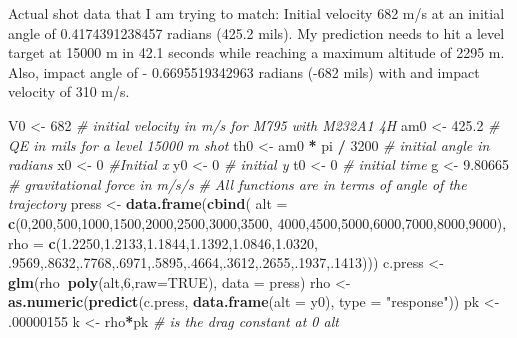 \documentclass[
]{article}
\newenvironment{Shaded}{\begin{snugshade}}{\end{snugshade}}
\newcommand{\CommentTok}[1]{\textcolor[rgb]{0.56,0.35,0.01}{\textit{#1}}}
\newcommand{\DataTypeTok}[1]{\textcolor[rgb]{0.13,0.29,0.53}{#1}}
\newcommand{\DecValTok}[1]{\textcolor[rgb]{0.00,0.00,0.81}{#1}}
\newcommand{\FloatTok}[1]{\textcolor[rgb]{0.00,0.00,0.81}{#1}}
\newcommand{\KeywordTok}[1]{\textcolor[rgb]{0.13,0.29,0.53}{\textbf{#1}}}
\newcommand{\NormalTok}[1]{#1}
\newcommand{\OperatorTok}[1]{\textcolor[rgb]{0.81,0.36,0.00}{\textbf{#1}}}
\newcommand{\OtherTok}[1]{\textcolor[rgb]{0.56,0.35,0.01}{#1}}
\newcommand{\StringTok}[1]{\textcolor[rgb]{0.31,0.60,0.02}{#1}}
\begin{document}
Actual shot data that I am trying to match: Initial velocity 682 m/s at
an initial angle of 0.4174391238457 radians (425.2 mils). My prediction
needs to hit a level target at 15000 m in 42.1 seconds while reaching a
maximum altitude of 2295 m. Also, impact angle of - 0.6695519342963
radians (-682 mils) with and impact velocity of 310 m/s.

\begin{Shaded}
\begin{Highlighting}[]
\NormalTok{V0 <-}\StringTok{ }\DecValTok{682} \CommentTok{# initial velocity in m/s for M795 with M232A1 4H}
\NormalTok{am0 <-}\StringTok{ }\FloatTok{425.2} \CommentTok{# QE in mils for a level 15000 m shot}
\NormalTok{th0 <-}\StringTok{ }\NormalTok{am0 }\OperatorTok{*}\StringTok{ }\NormalTok{pi }\OperatorTok{/}\StringTok{ }\DecValTok{3200} \CommentTok{# initial angle in radians}
\NormalTok{x0 <-}\StringTok{ }\DecValTok{0} \CommentTok{#Initial x}
\NormalTok{y0 <-}\StringTok{ }\DecValTok{0} \CommentTok{# initial y}
\NormalTok{t0 <-}\StringTok{ }\DecValTok{0} \CommentTok{# initial time}
\NormalTok{g <-}\StringTok{ }\FloatTok{9.80665} \CommentTok{# gravitational force in m/s/s}
\CommentTok{# All functions are in terms of angle of the trajectory}
\NormalTok{press <-}\StringTok{ }\KeywordTok{data.frame}\NormalTok{(}\KeywordTok{cbind}\NormalTok{(}
  \DataTypeTok{alt =} \KeywordTok{c}\NormalTok{(}\DecValTok{0}\NormalTok{,}\DecValTok{200}\NormalTok{,}\DecValTok{500}\NormalTok{,}\DecValTok{1000}\NormalTok{,}\DecValTok{1500}\NormalTok{,}\DecValTok{2000}\NormalTok{,}\DecValTok{2500}\NormalTok{,}\DecValTok{3000}\NormalTok{,}\DecValTok{3500}\NormalTok{,}
          \DecValTok{4000}\NormalTok{,}\DecValTok{4500}\NormalTok{,}\DecValTok{5000}\NormalTok{,}\DecValTok{6000}\NormalTok{,}\DecValTok{7000}\NormalTok{,}\DecValTok{8000}\NormalTok{,}\DecValTok{9000}\NormalTok{),}
  \DataTypeTok{rho =} \KeywordTok{c}\NormalTok{(}\FloatTok{1.2250}\NormalTok{,}\FloatTok{1.2133}\NormalTok{,}\FloatTok{1.1844}\NormalTok{,}\FloatTok{1.1392}\NormalTok{,}\FloatTok{1.0846}\NormalTok{,}\FloatTok{1.0320}\NormalTok{,}
          \FloatTok{.9569}\NormalTok{,.}\DecValTok{8632}\NormalTok{,.}\DecValTok{7768}\NormalTok{,.}\DecValTok{6971}\NormalTok{,.}\DecValTok{5895}\NormalTok{,.}\DecValTok{4664}\NormalTok{,.}\DecValTok{3612}\NormalTok{,.}\DecValTok{2655}\NormalTok{,.}\DecValTok{1937}\NormalTok{,.}\DecValTok{1413}\NormalTok{)))}
\NormalTok{c.press <-}\StringTok{ }\KeywordTok{glm}\NormalTok{(rho}\OperatorTok{~}\KeywordTok{poly}\NormalTok{(alt,}\DecValTok{6}\NormalTok{,}\DataTypeTok{raw=}\OtherTok{TRUE}\NormalTok{), }\DataTypeTok{data =}\NormalTok{ press)}
\NormalTok{rho <-}\StringTok{ }\KeywordTok{as.numeric}\NormalTok{(}\KeywordTok{predict}\NormalTok{(c.press, }\KeywordTok{data.frame}\NormalTok{(}\DataTypeTok{alt =}\NormalTok{ y0), }\DataTypeTok{type =} \StringTok{"response"}\NormalTok{))}
\NormalTok{pk <-}\StringTok{ }\FloatTok{.00000155}
\NormalTok{k <-}\StringTok{ }\NormalTok{rho}\OperatorTok{*}\NormalTok{pk }\CommentTok{# is the drag constant at 0 alt}


\end{Highlighting}
\end{Shaded}
\end{document}
